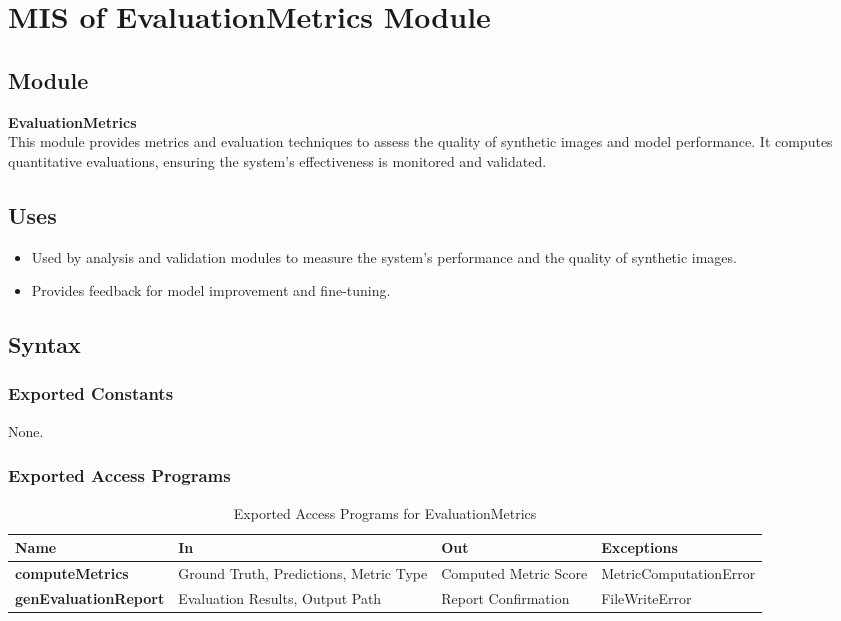 \documentclass[12pt, titlepage]{article}
\begin{document}
\section{MIS of EvaluationMetrics Module}

\subsection{Module}
\textbf{EvaluationMetrics} \\
This module provides metrics and evaluation techniques to assess the quality of synthetic images and model performance. It computes quantitative evaluations, ensuring the system’s effectiveness is monitored and validated.

\subsection{Uses}
\begin{itemize}
    \item Used by analysis and validation modules to measure the system's performance and the quality of synthetic images.
    \item Provides feedback for model improvement and fine-tuning.
\end{itemize}

\subsection{Syntax}

\subsubsection{Exported Constants}
None.

\subsubsection{Exported Access Programs}

\begin{table}[h!]
\centering
\begin{tabular}{|p{4cm}|p{4cm}|p{4cm}|p{4cm}|}
    \hline
    \textbf{Name} & \textbf{In} & \textbf{Out} & \textbf{Exceptions} \\
    \hline
    \textbf{computeMetrics} & Ground Truth, Predictions, Metric Type & Computed Metric Score & MetricComputationError \\
    \hline
    \textbf{genEvaluationReport} & Evaluation Results, Output Path & Report Confirmation & FileWriteError \\
    \hline
\end{tabular}
\caption{Exported Access Programs for EvaluationMetrics}
\label{table:evalmetrics}
\end{table}
\end{document}
